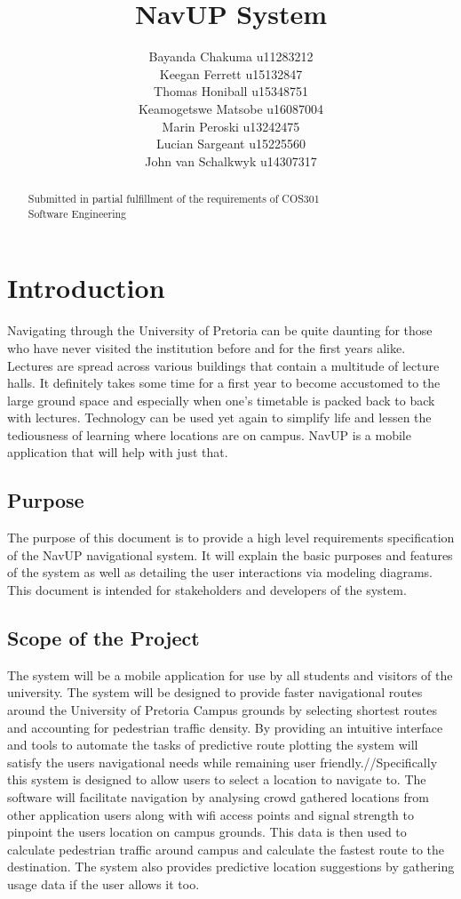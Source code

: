 \documentclass[a4paper, 12pt, one column, aas_macros]{article}
\title{NavUP System}
\author{
Bayanda Chakuma u11283212\\
Keegan Ferrett u15132847\\
Thomas Honiball u15348751\\
Keamogetswe Matsobe u16087004\\
Marin Peroski u13242475\\
Lucian Sargeant u15225560\\
John van Schalkwyk u14307317}
\begin{document}
\maketitle

\begin{abstract}
\begin{center}
Submitted in partial fulfillment of the requirements of COS301 \\Software Engineering
\end{center}
\end{abstract}

\section{Introduction}
Navigating through the University of Pretoria can be quite daunting for those who have never visited the institution before and for the first years alike. Lectures are spread across various buildings that contain a multitude of lecture halls. It definitely takes some time for a first year to become accustomed to the large ground space and especially when one’s timetable is packed back to back with lectures. Technology can be used yet again to simplify life and lessen the tediousness of learning where locations are on campus. NavUP is a mobile application that will help with just that.

\subsection{Purpose}
The purpose of this document is to provide a high level requirements specification of the NavUP navigational system. It will explain the basic purposes and features of the system as well as detailing the user interactions via modeling diagrams. This document is intended for stakeholders and developers of the system.

\subsection{Scope of the Project}
The system will be a mobile application for use by all students and visitors of the university. The system will be designed to provide faster navigational routes around the University of Pretoria Campus grounds by selecting shortest routes and accounting for pedestrian traffic density. By providing an intuitive interface and tools to automate the tasks of predictive route plotting the system will satisfy the users navigational needs while remaining user friendly.//Specifically this system is designed to allow users to select a location to navigate to. The software will facilitate  navigation by analysing crowd gathered locations from other application users along with wifi access points and signal strength to pinpoint the users location on campus grounds. This data is then used to calculate pedestrian traffic around campus and calculate the fastest route to the destination. The system also provides predictive location suggestions by gathering usage data if the user allows it too.
\end{document}

